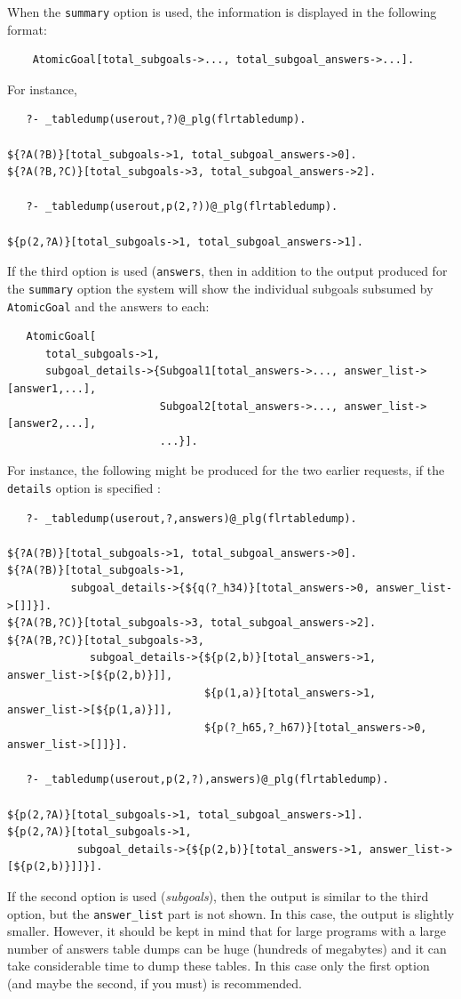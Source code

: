 \documentclass[11pt]{article}
\begin{document}
When the \texttt{summary}  option is used, the information is displayed in the
following format:
\begin{verbatim}
    AtomicGoal[total_subgoals->..., total_subgoal_answers->...].
\end{verbatim}
For instance,
\begin{verbatim}
   ?- _tabledump(userout,?)@_plg(flrtabledump).

${?A(?B)}[total_subgoals->1, total_subgoal_answers->0].
${?A(?B,?C)}[total_subgoals->3, total_subgoal_answers->2].

   ?- _tabledump(userout,p(2,?))@_plg(flrtabledump).

${p(2,?A)}[total_subgoals->1, total_subgoal_answers->1].
\end{verbatim}
If the third option is used (\texttt{answers},
then in addition to the output
produced for the \texttt{summary} option the system will show the
individual subgoals subsumed by \texttt{AtomicGoal} and the answers to
each:
\begin{verbatim}
   AtomicGoal[
      total_subgoals->1,
      subgoal_details->{Subgoal1[total_answers->..., answer_list->[answer1,...],
                        Subgoal2[total_answers->..., answer_list->[answer2,...],
                        ...}].
\end{verbatim}
For instance, the following might be produced for the two earlier requests,
if the \texttt{details} option is specified :
\begin{verbatim}
   ?- _tabledump(userout,?,answers)@_plg(flrtabledump).

${?A(?B)}[total_subgoals->1, total_subgoal_answers->0].
${?A(?B)}[total_subgoals->1,
          subgoal_details->{${q(?_h34)}[total_answers->0, answer_list->[]]}].
${?A(?B,?C)}[total_subgoals->3, total_subgoal_answers->2].
${?A(?B,?C)}[total_subgoals->3,
             subgoal_details->{${p(2,b)}[total_answers->1, answer_list->[${p(2,b)}]],
                               ${p(1,a)}[total_answers->1, answer_list->[${p(1,a)}]],
                               ${p(?_h65,?_h67)}[total_answers->0, answer_list->[]]}].

   ?- _tabledump(userout,p(2,?),answers)@_plg(flrtabledump).

${p(2,?A)}[total_subgoals->1, total_subgoal_answers->1].
${p(2,?A)}[total_subgoals->1,
           subgoal_details->{${p(2,b)}[total_answers->1, answer_list->[${p(2,b)}]]}].

\end{verbatim}
If the second option is used (\emph{subgoals}), then the output is similar
to the third option, but the \texttt{answer\_list} part is not shown.  In
this case, the output is slightly smaller. However, it should be kept in
mind that for large programs with a large number of answers table dumps can
be huge (hundreds of megabytes) and it can take
considerable time to dump these tables. In this case only the first option
(and maybe the second, if you must) is recommended.
\end{document}

